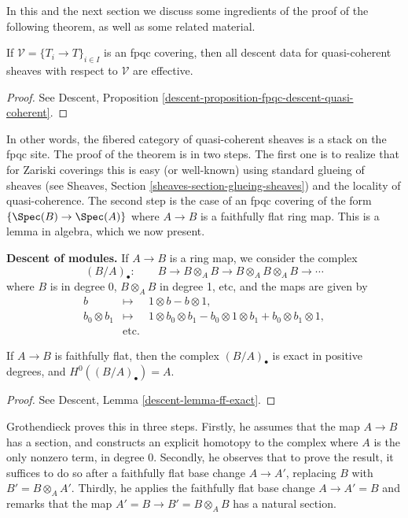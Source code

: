 \noindent
In this and the next section we discuss some ingredients of the proof
of the following theorem, as well as some related material.

\begin{theorem}
\label{theorem-descent-quasi-coherent}
If $\mathcal{V} = \{T_i \to T\}_{i\in I}$ is an fpqc covering, then all
descent data for quasi-coherent sheaves with respect to $\mathcal{V}$
are effective.
\end{theorem}

\begin{proof}
See
Descent, Proposition \ref{descent-proposition-fpqc-descent-quasi-coherent}.
\end{proof}

\noindent
In other words, the fibered category of quasi-coherent sheaves is a stack on
the fpqc site.
The proof of the theorem is in two steps. The first one is to realize that for
Zariski coverings this is easy (or well-known) using standard glueing of
sheaves (see
Sheaves, Section \ref{sheaves-section-glueing-sheaves})
and the locality of quasi-coherence. The second step is the case of an
fpqc covering of the form $\{\Spec(B) \to \Spec(A)\}$
where $A \to B$ is a faithfully flat ring map.
This is a lemma in algebra, which we now present.

\medskip\noindent
{\bf Descent of modules.}
If $A \to B$ is a ring map, we consider the complex
$$
(B/A)_\bullet : \qquad B \to B \otimes_A B \to B \otimes_A B \otimes_A B \to
\cdots
$$
where $B$ is in degree 0, $B \otimes_A B$ in degree 1, etc, and the maps are
given by
\begin{eqnarray*}
b & \mapsto & 1 \otimes b - b \otimes 1, \\
b_0 \otimes b_1 & \mapsto & 1 \otimes b_0 \otimes b_1 - b_0 \otimes 1 \otimes
b_1 + b_0 \otimes b_1 \otimes 1, \\
& \text{etc.}
\end{eqnarray*}

\begin{lemma}
\label{lemma-algebra-descent}
If $A \to B$ is faithfully flat, then the complex $(B/A)_\bullet$ is exact in
positive degrees, and $H^0((B/A)_\bullet) = A$.
\end{lemma}

\begin{proof}
See Descent, Lemma \ref{descent-lemma-ff-exact}.
\end{proof}

\noindent
Grothendieck proves this in three steps. Firstly, he assumes that the map $A
\to B$ has a section, and constructs an explicit homotopy to the complex where
$A$ is the only nonzero term, in degree 0. Secondly, he observes that to prove
the result, it suffices to do so after a faithfully flat base change $A \to
A'$, replacing $B$ with $B' = B \otimes_A A'$. Thirdly, he applies the
faithfully flat base change $A \to A' =B$ and remarks that the map $A' = B \to
B' = B \otimes_A B$ has a natural section.

